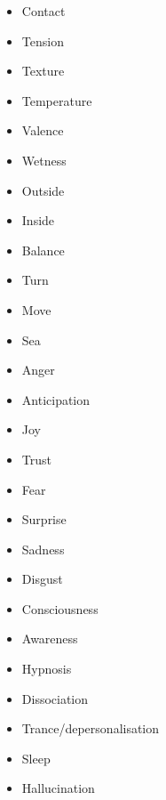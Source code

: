 \begin{multicols}{2}
\begin{itemize}
\item   Contact 

\item   Tension 

\item   Texture 

\item   Temperature 

\item   Valence 

\item   Wetness 

\item   Outside 

\item   Inside 

\item   Balance 

\item   Turn 

\item   Move 

\item   Sea 

\item   Anger 

\item   Anticipation 

\item   Joy 

\item   Trust 

\item   Fear 

\item   Surprise 

\item   Sadness 

\item   Disgust 

\item   Consciousness 

\item   Awareness 

\item   Hypnosis 

\item   Dissociation 

\item   Trance/depersonalisation 

\item   Sleep 

\item   Hallucination 


\end{itemize}
\end{multicols}
